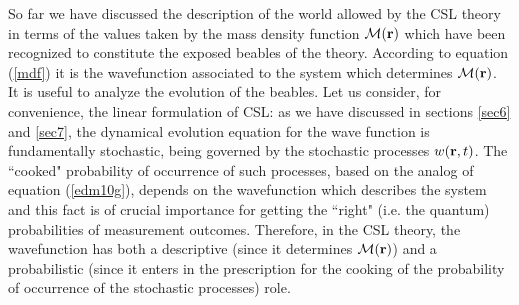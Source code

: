 \documentclass[10pt,a4paper]{article}
\begin{document}
So far we have discussed the description of the world allowed by
the CSL theory in terms of the values taken by the mass density
function ${\mathcal M}({\bf r})$ which have been recognized to
constitute the exposed beables of the theory. According to
equation (\ref{mdf}) it is the wavefunction associated to the
system which determines ${\mathcal M}({\bf r})$. It is useful to
analyze the evolution of the beables. Let us consider, for
convenience, the linear formulation of CSL: as we have discussed
in sections \ref{sec6} and \ref{sec7}, the dynamical evolution
equation for the wave function is fundamentally stochastic, being
governed by the stochastic processes $w({\bf r},t)$. The ``cooked"
probability of occurrence of such processes, based on the analog
of equation (\ref{edm10g}), depends on the wavefunction which
describes the system and this fact is of crucial importance for
getting the ``right" (i.e. the quantum) probabilities of
measurement outcomes. Therefore, in the CSL theory, the
wavefunction has both a descriptive (since it determines
${\mathcal M}({\bf r})$) and a probabilistic (since it enters in
the prescription for the cooking of the probability of occurrence
of the stochastic processes) role.
\end{document}
